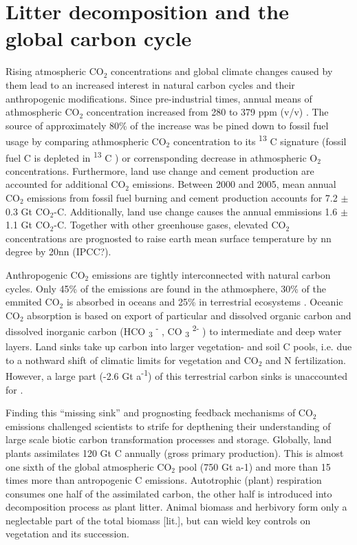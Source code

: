  
\section{Litter decomposition and the global carbon cycle}

Rising atmospheric CO$_{2}$ concentrations and global climate changes caused by them \citep{IPCC2007pt1ch1} lead to an increased interest in natural carbon cycles and their anthropogenic modifications. Since pre-industrial times, annual means of athmospheric CO$_{2}$ concentration increased from 280 to 379 ppm (v/v) \citep{IPCC2007pt1ch1}. The source of approximately 80\% of the increase was be pined down to fossil fuel usage by comparing athmospheric CO$_{2}$ concentration to its \textsuperscript{13} C signature (fossil fuel C is depleted in \textsuperscript{13} C ) or corrensponding decrease in athmospheric O$_{2}$ concentrations\citep{IPCC2007pt1ch1}. Furthermore, land use change and cement production are accounted for additional CO$_{2}$ emissions. Between 2000 and 2005, mean annual CO$_{2}$ emissions from fossil fuel burning and cement production accounts for 7.2 $\pm$ 0.3 Gt CO$_{2}$-C. Additionally, land use change causes the annual emmissions 1.6 $\pm$ 1.1 Gt CO$_{2}$-C. Together with other greenhouse gases, elevated CO$_{2}$ concentrations are prognosted to raise earth mean surface temperature by nn degree by 20nn (IPCC?).

Anthropogenic CO$_{2}$ emissions are tightly interconnected with natural carbon cycles. Only 45\% of the emissions are found in the athmosphere, 30\% of the emmited CO$_{2}$ is absorbed in oceans and 25\% in terrestrial ecosystems . Oceanic CO$_{2}$ absorption is based on export of particular and dissolved organic carbon and dissolved inorganic carbon (HCO \textsubscript{3} \textsuperscript{-} , CO \textsubscript{3} \textsuperscript{2-} ) to intermediate and deep water layers. Land sinks take up carbon into larger vegetation- and soil C pools, i.e. due to a nothward shift of climatic limits for vegetation and CO$_{2}$ and N fertilization. However, a large part (-2.6 Gt a\textsuperscript{-1}) of this terrestrial carbon sinks is unaccounted for \citep[p. 515]{IPCC2007pt1ch7}. 

Finding this ``missing sink'' and prognosting feedback mechanisms of CO$_{2}$ emissions challenged scientists to strife for depthening their understanding of large scale biotic carbon transformation processes and storage. Globally, land plants assimilates 120 Gt C annually (gross primary production). This is almost one sixth of the global atmospheric CO$_{2}$ pool (750 Gt a-1) and more than 15 times more than antropogenic C emissions. Autotrophic (plant) respiration consumes one half of the assimilated carbon, the other half is introduced into decomposition process as plant litter. Animal biomass and herbivory form only a neglectable part of the total biomass [lit.], but can wield key controls on vegetation and its succession.

